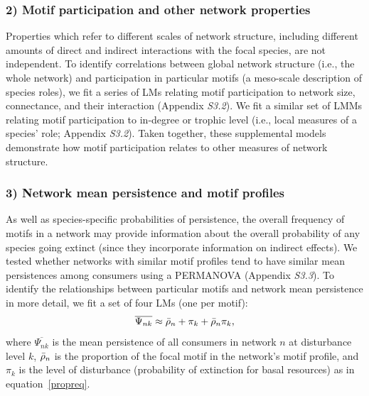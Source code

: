 \documentclass[12pt]{article}
\begin{document}
\begin{spacing}{2.0}
    \subsubsection*{2) Motif participation and other network properties}    
        
        Properties which refer to different scales of network structure, including different amounts of direct and indirect interactions with the focal species, are not independent. 
        To identify correlations between global network structure (i.e., the whole network) and participation in particular motifs (a meso-scale description of species roles), we fit a series of LMs relating motif participation to network size, connectance, and their interaction (Appendix \emph{S3.2}).
        We fit a similar set of  LMMs relating motif participation to in-degree or trophic level (i.e., local measures of a species' role; Appendix \emph{S3.2}).
        Taken together, these supplemental models demonstrate how motif participation relates to other measures of network structure.
        
        
    \subsubsection*{3) Network mean persistence and motif profiles}

        As well as species-specific probabilities of persistence, the overall frequency of motifs in a network may provide information about the overall probability of any species going extinct (since they incorporate information on indirect effects).
        We tested whether networks with similar motif profiles tend to have similar mean persistences among consumers using a PERMANOVA (Appendix \emph{S3.3}).
        To identify the relationships between particular motifs and network mean persistence in more detail, we fit a set of four LMs (one per motif):
            \begin{equation}
                \overline{\Psi_{nk}} \approx \Bar{\rho}_{n} + \pi_{k} + \Bar{\rho}_{n}\pi_{k},
                \label{netpropeq}
            \end{equation}
        \noindent where $\overline{\Psi_{nk}}$ is the mean persistence of all consumers in network $n$ at disturbance level $k$, $\Bar{\rho}_{n}$ is the proportion of the focal motif in the network's motif profile, and $\pi_k$ is the level of disturbance (probability of extinction for basal resources) as in equation~\ref{propreq}.
            

\end{spacing}
\end{document}
